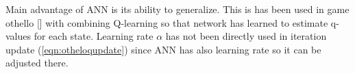   Main advantage of ANN is its ability to generalize. This is has been used
  in game othello [\cite{othello}] with combining Q-learning so that network
  has learned to estimate q-values for each state. Learning rate $\alpha$ has
  not been directly used in iteration update (\ref{eqn:otheloqupdate}) since
  ANN has also learning rate so it can be adjusted there.

